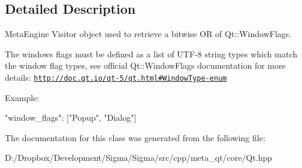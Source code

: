 \subsection{Detailed Description}
Meta\+Engine Visitor object used to retrieve a bitwise O\+R of Qt\+::\+Window\+Flags. 

The windows flags must be defined as a list of U\+T\+F-\/8 string types which match the window flag types, see official Qt\+::\+Window\+Flags documentation for more details\+: \href{http://doc.qt.io/qt-5/qt.html#WindowType-enum}{\tt http\+://doc.\+qt.\+io/qt-\/5/qt.\+html\#\+Window\+Type-\/enum}

Example\+:


\begin{DoxyCode}
\textcolor{stringliteral}{"window\_flags"}: [\textcolor{stringliteral}{"Popup"}, \textcolor{stringliteral}{"Dialog"}]
\end{DoxyCode}
 

The documentation for this class was generated from the following file\+:\begin{DoxyCompactItemize}
\item 
D\+:/\+Dropbox/\+Development/\+Sigma/\+Sigma/src/cpp/meta\+\_\+qt/core/Qt.\+hpp\end{DoxyCompactItemize}
